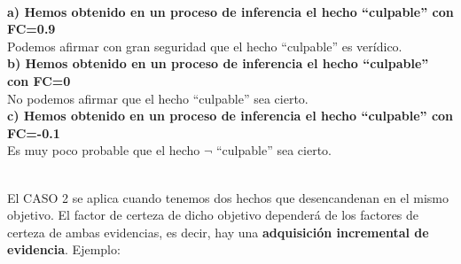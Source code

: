 \documentclass[a4paper,11pt, includehead]{article}
\begin{document}
\vspace{2ex}

\\

\textbf{a) Hemos obtenido en un proceso de inferencia el hecho “culpable” con FC=0.9}\\
\indent Podemos afirmar con gran seguridad que el hecho “culpable” es verídico.\\

\textbf{b) Hemos obtenido en un proceso de inferencia el hecho “culpable” con FC=0}\\
\indent No podemos afirmar que el hecho “culpable” sea cierto.\\

\textbf{c) Hemos obtenido en un proceso de inferencia el hecho “culpable” con FC=-0.1}\\
\indent Es muy poco probable que el hecho $\neg$ “culpable” sea cierto.\\

\vspace{2ex}

\\

El CASO 2 se aplica cuando tenemos dos hechos que desencandenan en el mismo objetivo. El factor de certeza de dicho objetivo dependerá de los factores de certeza de ambas evidencias, es decir, hay una \textbf{adquisición incremental de evidencia}. Ejemplo:\\[2ex]

\begin{center}
\end{center}
\end{document}
